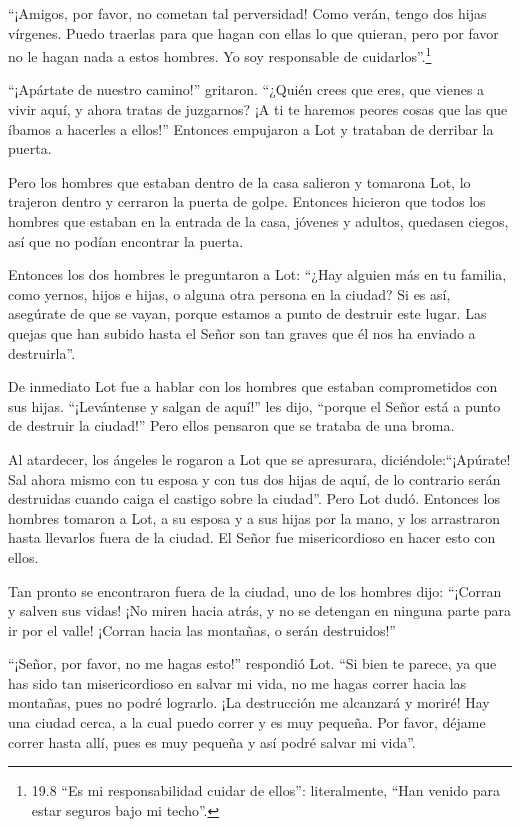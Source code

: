  ``¡Amigos, por favor, no cometan tal perversidad!
 Como verán, tengo dos hijas vírgenes. Puedo traerlas para
que hagan con ellas lo que quieran, pero por favor no le hagan nada a
estos hombres. Yo soy responsable de cuidarlos''.\footnote{19.8 ``Es mi
  responsabilidad cuidar de ellos'': literalmente, ``Han venido para
  estar seguros bajo mi techo''.}

 ``¡Apártate de nuestro camino!'' gritaron. ``¿Quién crees
que eres, que vienes a vivir aquí, y ahora tratas de juzgarnos? ¡A ti te
haremos peores cosas que las que íbamos a hacerles a ellos!'' Entonces
empujaron a Lot y trataban de derribar la puerta.

 Pero los hombres que estaban dentro de la casa salieron y
tomarona Lot, lo trajeron dentro y cerraron la puerta de golpe.
 Entonces hicieron que todos los hombres que estaban en la
entrada de la casa, jóvenes y adultos, quedasen ciegos, así que no
podían encontrar la puerta.

 Entonces los dos hombres le preguntaron a Lot: ``¿Hay
alguien más en tu familia, como yernos, hijos e hijas, o alguna otra
persona en la ciudad? Si es así, asegúrate de que se vayan,
 porque estamos a punto de destruir este lugar. Las quejas
que han subido hasta el Señor son tan graves que él nos ha enviado a
destruirla''.

 De inmediato Lot fue a hablar con los hombres que estaban
comprometidos con sus hijas. ``¡Levántense y salgan de aquí!'' les dijo,
``porque el Señor está a punto de destruir la ciudad!'' Pero ellos
pensaron que se trataba de una broma.

 Al atardecer, los ángeles le rogaron a Lot que se
apresurara, diciéndole:``¡Apúrate! Sal ahora mismo con tu esposa y con
tus dos hijas de aquí, de lo contrario serán destruidas cuando caiga el
castigo sobre la ciudad''.  Pero Lot dudó. Entonces los
hombres tomaron a Lot, a su esposa y a sus hijas por la mano, y los
arrastraron hasta llevarlos fuera de la ciudad. El Señor fue
misericordioso en hacer esto con ellos.

 Tan pronto se encontraron fuera de la ciudad, uno de los
hombres dijo: ``¡Corran y salven sus vidas! ¡No miren hacia atrás, y no
se detengan en ninguna parte para ir por el valle! ¡Corran hacia las
montañas, o serán destruidos!''

 ``¡Señor, por favor, no me hagas esto!'' respondió Lot.
 ``Si bien te parece, ya que has sido tan misericordioso en
salvar mi vida, no me hagas correr hacia las montañas, pues no podré
lograrlo. ¡La destrucción me alcanzará y moriré!  Hay una
ciudad cerca, a la cual puedo correr y es muy pequeña. Por favor, déjame
correr hasta allí, pues es muy pequeña y así podré salvar mi vida''.

